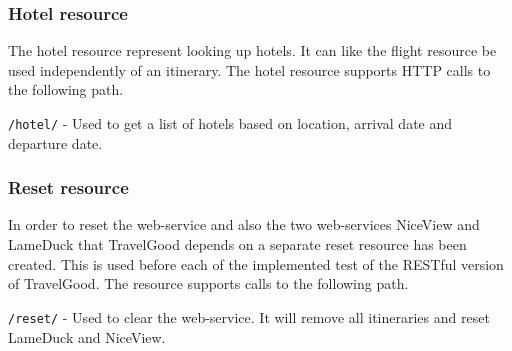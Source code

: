 \subsubsection{Hotel resource}
The hotel resource represent looking up hotels. It can like the flight resource be used independently of an itinerary. The hotel resource supports HTTP calls to the following path.
\begin{description}
	\item \texttt{/hotel/} - Used to get a list of hotels based on location, arrival date and departure date.
\end{description}

\subsubsection{Reset resource}
In order to reset the web-service and also the two web-services NiceView and LameDuck that TravelGood depends on a separate reset resource has been created. This is used before each of the implemented test of the RESTful version of TravelGood. The resource supports calls to the following path.
\begin{description}
	\item \texttt{/reset/} - Used to clear the web-service. It will remove all itineraries and reset LameDuck and NiceView.
\end{description}

